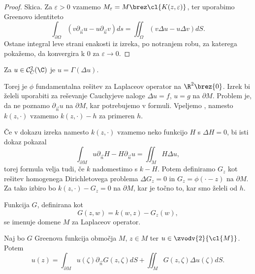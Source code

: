 \begin{proof}
  Skica.
  Za $\varepsilon > 0$ vzamemo $M_\varepsilon = M \brez \cl{K(z, \varepsilon)}$,
  ter uporabimo Greenovo identiteto
  \[
	\int_{\partial \Omega} (v \partial_{\vec{n}} u - u \partial_{\vec{n}} v) ds
	= \iint_\Omega (v \Delta u - u \Delta v) dS.
  \]
  Ostane integral leve strani enakosti iz izreka, po notranjem robu, za katerega
  pokažemo, da konvergira k $0$ za $\varepsilon \to 0$.
\end{proof}


\begin{posledica}
  Za $u \in \mathcal{C}^2_C(\C)$ je $u = \Gamma(\Delta u)$.
\end{posledica}

Torej je $\phi$ fundamentalna rešitev za Laplaceov operator na $\R^2 \brez
\{0\}$.
Izrek bi želeli uporabiti za reševanje Cauchyjeve naloge $\Delta u = f$, $u = g$
na $\partial M$.
Problem je, da ne poznamo $\partial_{\vec{n}} u$ na $\partial M$, kar
potrebujemo v formuli.
Vpeljemo , namesto $k(z, \cdot)$ vzamemo $k(z, \cdot)
- h$ za primeren $h$.

Če v dokazu izreka namesto $k(z, \cdot)$ vzamemo neko funkcijo $H$ s $\Delta H =
0$, bi isti dokaz pokazal
\[
  \int_{\partial M} u \partial_{\vec{n}} H - H \partial_{\vec{n}} u
  = \iint_M H \Delta u,
\]
torej formula velja tudi, če $k$ nadomestimo s $k-H$.
Potem definiramo $G_z$ kot rešitev homogenega Dirichletovega problema $\Delta
G_z = 0$ in $G_z = \phi(\cdot - z)$ na $\partial M$.
Za tako izbiro bo $k(z, \cdot) - G_z = 0$ na $\partial M$, kar je točno to, kar
smo želeli od $h$.

\begin{definicija}
  Funkcija $G$, definirana kot
  \[
	G(z,w) = k(w,z) - G_z(w),
  \]
  se imenuje  domene $M$ za Laplaceov operator.
\end{definicija}


\begin{izrek}
  Naj bo $G$ Greenova funkcija območja $M$, $z \in M$ ter $u \in
  \zvodv{2}{\cl{M}}$.
  Potem
  \[
	u(z) = \int_{\partial M} u(\zeta) \partial_{\vec{n}} G(z, \zeta) dS
	+ \iint_M G(z, \zeta) \Delta u(\zeta) dS.
  \]
\end{izrek}

